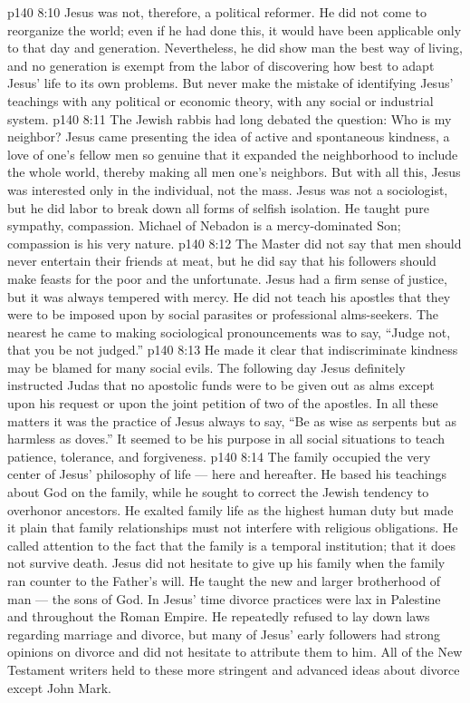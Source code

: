 \vs p140 8:10 Jesus was not, therefore, a political reformer. He did not come to reorganize the world; even if he had done this, it would have been applicable only to that day and generation. Nevertheless, he did show man the best way of living, and no generation is exempt from the labor of discovering how best to adapt Jesus’ life to its own problems. But never make the mistake of identifying Jesus’ teachings with any political or economic theory, with any social or industrial system.
\vs p140 8:11 \pc {}\bibnobreakspace {} The Jewish rabbis had long debated the question: Who is my neighbor? Jesus came presenting the idea of active and spontaneous kindness, a love of one’s fellow men so genuine that it expanded the neighborhood to include the whole world, thereby making all men one’s neighbors. But with all this, Jesus was interested only in the individual, not the mass. Jesus was not a sociologist, but he did labor to break down all forms of selfish isolation. He taught pure sympathy, compassion. Michael of Nebadon is a mercy\hyp{}dominated Son; compassion is his very nature.
\vs p140 8:12 The Master did not say that men should never entertain their friends at meat, but he did say that his followers should make feasts for the poor and the unfortunate. Jesus had a firm sense of justice, but it was always tempered with mercy. He did not teach his apostles that they were to be imposed upon by social parasites or professional alms\hyp{}seekers. The nearest he came to making sociological pronouncements was to say, \textcolor{ubdarkred}{“Judge not, that you be not judged.”}
\vs p140 8:13 He made it clear that indiscriminate kindness may be blamed for many social evils. The following day Jesus definitely instructed Judas that no apostolic funds were to be given out as alms except upon his request or upon the joint petition of two of the apostles. In all these matters it was the practice of Jesus always to say, \textcolor{ubdarkred}{“Be as wise as serpents but as harmless as doves.”} It seemed to be his purpose in all social situations to teach patience, tolerance, and forgiveness.
\vs p140 8:14 The family occupied the very center of Jesus’ philosophy of life --- here and hereafter. He based his teachings about God on the family, while he sought to correct the Jewish tendency to overhonor ancestors. He exalted family life as the highest human duty but made it plain that family relationships must not interfere with religious obligations. He called attention to the fact that the family is a temporal institution; that it does not survive death. Jesus did not hesitate to give up his family when the family ran counter to the Father’s will. He taught the new and larger brotherhood of man --- the sons of God. In Jesus’ time divorce practices were lax in Palestine and throughout the Roman Empire. He repeatedly refused to lay down laws regarding marriage and divorce, but many of Jesus’ early followers had strong opinions on divorce and did not hesitate to attribute them to him. All of the New Testament writers held to these more stringent and advanced ideas about divorce except John Mark.

